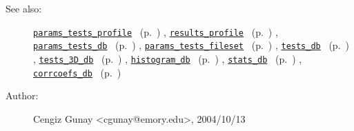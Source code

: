 \begin{description}
%
%
\item[See also:]%
\hyperlink{ref_params_tests_profile}{\texttt{params\_tests\_profile}}%
\ (p.~\pageref{ref_params_tests_profile})%
%
, \hyperlink{ref_results_profile}{\texttt{results\_profile}}%
\ (p.~\pageref{ref_results_profile})%
%
, \hyperlink{ref_params_tests_db}{\texttt{params\_tests\_db}}%
\ (p.~\pageref{ref_params_tests_db})%
%
, \hyperlink{ref_params_tests_fileset}{\texttt{params\_tests\_fileset}}%
\ (p.~\pageref{ref_params_tests_fileset})%
%
, \hyperlink{ref_tests_db}{\texttt{tests\_db}}%
\ (p.~\pageref{ref_tests_db})%
%
, \hyperlink{ref_tests_3D_db}{\texttt{tests\_3D\_db}}%
\ (p.~\pageref{ref_tests_3D_db})%
%
, \hyperlink{ref_histogram_db}{\texttt{histogram\_db}}%
\ (p.~\pageref{ref_histogram_db})%
%
, \hyperlink{ref_stats_db}{\texttt{stats\_db}}%
\ (p.~\pageref{ref_stats_db})%
%
, \hyperlink{ref_corrcoefs_db}{\texttt{corrcoefs\_db}}%
\ (p.~\pageref{ref_corrcoefs_db})%
%
%
\item[Author:]%
Cengiz Gunay <cgunay@emory.edu>, 2004/10/13%
\end{description}
\methodline%
